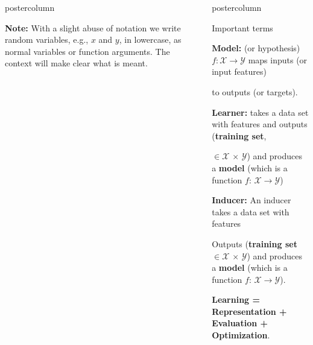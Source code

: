 \documentclass{beamer}
\newlength{\columnheight} %
\begin{document}
\begin{frame}[fragile]{}
\begin{columns}
\begin{column}{.31\textwidth}
\begin{beamercolorbox}[center]{postercolumn}
\begin{minipage}{.98\textwidth}
{\begin{myblock}{}
						\textbf{Note:} With a slight abuse of notation we write random variables, e.g., $x$ and $y$, in lowercase, as normal variables or function arguments. The context will make clear what is meant.
						\end{myblock}
				}
			\end{minipage}
		\end{beamercolorbox}
	\end{column}
	\begin{column}{.31\textwidth}
		\begin{beamercolorbox}[center]{postercolumn}
			\begin{minipage}{.98\textwidth}
				\parbox[t][\columnheight]{\textwidth}{
				    \begin{myblock}{Important terms}
				        \begin{codebox}
						    \textbf{Model: } (or hypothesis) $f : \mathcal{X} \rightarrow \mathcal{Y}$ maps inputs (or input features)
						\end{codebox}
						\begin{codebox}
						    to outputs (or targets).
						\end{codebox}
						\hspace*{1ex}
						\begin{codebox}
						\textbf{Learner: } takes a data set with features and outputs (\textbf{training set},
						\end{codebox}
						\begin{codebox}
						$\in \mathcal{X}\, \times \,\mathcal{Y}$)  and produces a \textbf{model} (which is a function $f:\, \mathcal{X} \to \mathcal{Y}$)
						\end{codebox}
						\hspace*{1ex}
						\begin{codebox}
						\textbf{Inducer: }An inducer takes a data set with features
						\end{codebox}
						\hspace*{1ex}Outputs (\textbf{training set} $\in \mathcal{X}\, \times \,\mathcal{Y}$)  and produces a \textbf{model} (which is a \hspace*{1ex}function $f:\, \mathcal{X} \to \mathcal{Y}$).
						\\
						\begin{codebox}
						    \textbf{Learning = Representation + Evaluation  + Optimization}.
						\end{codebox}
						\hspace*{1ex}
						\begin{codebox}

\end{codebox}
\end{myblock}}
\end{minipage}
\end{beamercolorbox}
\end{column}
\end{columns}
\end{frame}
\end{document}
